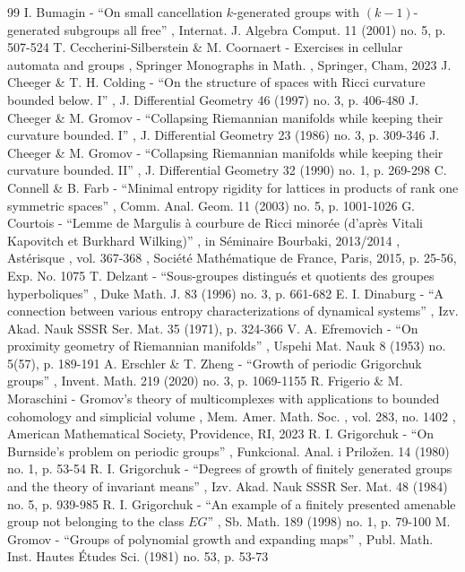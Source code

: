 \documentclass[10pt]{amsart}
\theoremstyle{definition}
\begin{document}
\begin{thebibliography}{99}
 I. Bumagin - “On small cancellation $k$-generated groups with $(k-1)$-generated subgroups all free” , Internat. J. Algebra Comput. 11 (2001) no. 5, p. 507-524
 T. Ceccherini-Silberstein \& M. Coornaert - Exercises in cellular automata and groups , Springer Monographs in Math. , Springer, Cham, 2023
 J. Cheeger \& T. H. Colding - “On the structure of spaces with Ricci curvature bounded below. I” , J. Differential Geometry 46 (1997) no. 3, p. 406-480
 J. Cheeger \& M. Gromov - “Collapsing Riemannian manifolds while keeping their curvature bounded. I” , J. Differential Geometry 23 (1986) no. 3, p. 309-346
 J. Cheeger \& M. Gromov - “Collapsing Riemannian manifolds while keeping their curvature bounded. II” , J. Differential Geometry 32 (1990) no. 1, p. 269-298
 C. Connell \& B. Farb - “Minimal entropy rigidity for lattices in products of rank one symmetric spaces” , Comm. Anal. Geom. 11 (2003) no. 5, p. 1001-1026
 G. Courtois - “Lemme de Margulis à courbure de Ricci minorée (d’après Vitali Kapovitch et Burkhard Wilking)” , in Séminaire Bourbaki, 2013/2014 , Astérisque , vol. 367-368 , Société Mathématique de France, Paris, 2015, p. 25-56, Exp. No. 1075
 T. Delzant - “Sous-groupes distingués et quotients des groupes hyperboliques” , Duke Math. J. 83 (1996) no. 3, p. 661-682
 E. I. Dinaburg - “A connection between various entropy characterizations of dynamical systems” , Izv. Akad. Nauk SSSR Ser. Mat. 35 (1971), p. 324-366
 V. A. Efremovich - “On proximity geometry of Riemannian manifolds” , Uspehi Mat. Nauk 8 (1953) no. 5(57), p. 189-191
 A. Erschler \& T. Zheng - “Growth of periodic Grigorchuk groups” , Invent. Math. 219 (2020) no. 3, p. 1069-1155
 R. Frigerio \& M. Moraschini - Gromov’s theory of multicomplexes with applications to bounded cohomology and simplicial volume , Mem. Amer. Math. Soc. , vol. 283, no. 1402 , American Mathematical Society, Providence, RI, 2023
 R. I. Grigorchuk - “On Burnside’s problem on periodic groups” , Funkcional. Anal. i Priložen. 14 (1980) no. 1, p. 53-54
 R. I. Grigorchuk - “Degrees of growth of finitely generated groups and the theory of invariant means” , Izv. Akad. Nauk SSSR Ser. Mat. 48 (1984) no. 5, p. 939-985
 R. I. Grigorchuk - “An example of a finitely presented amenable group not belonging to the class $EG$” , Sb. Math. 189 (1998) no. 1, p. 79-100
 M. Gromov - “Groups of polynomial growth and expanding maps” , Publ. Math. Inst. Hautes Études Sci. (1981) no. 53, p. 53-73

\end{thebibliography}
\end{document}
